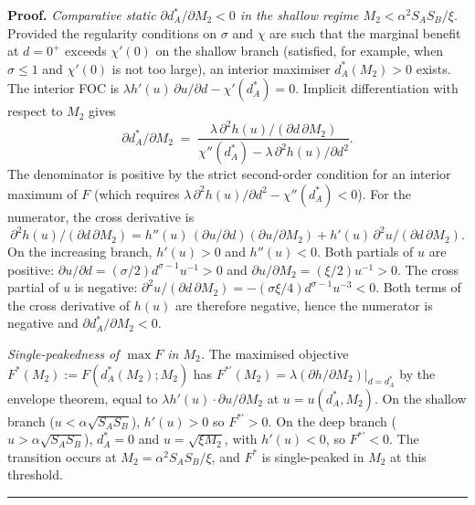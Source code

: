 \documentclass[11pt,twoside]{extarticle}
\newenvironment{proof}[1][Proof]{\noindent \textbf{#1.} }{\ \rule{0.5em}{0.5em}}
\begin{document}
\begin{proof}
\emph{Comparative static $\partial d_A^*/\partial M_2<0$ in the shallow regime $M_2<\alpha^2 S_A S_B/\xi$.} Provided the regularity conditions on $\sigma$ and $\chi$ are such that the marginal benefit at $d=0^+$ exceeds $\chi'(0)$ on the shallow branch (satisfied, for example, when $\sigma\le 1$ and $\chi'(0)$ is not too large), an interior maximiser $d_A^*(M_2)>0$ exists. The interior FOC is $\lambda h'(u)\,\partial u/\partial d-\chi'(d_A^*)=0$. Implicit differentiation with respect to $M_2$ gives
\[
\partial d_A^*/\partial M_2\;=\;\frac{\lambda\,\partial^2 h(u)/(\partial d\,\partial M_2)}{\chi''(d_A^*)-\lambda\,\partial^2 h(u)/\partial d^2}.
\]
The denominator is positive by the strict second-order condition for an interior maximum of $F$ (which requires $\lambda\,\partial^2 h(u)/\partial d^2-\chi''(d_A^*)<0$). For the numerator, the cross derivative is
\[
\partial^2 h(u)/(\partial d\,\partial M_2)=h''(u)\,(\partial u/\partial d)(\partial u/\partial M_2)+h'(u)\,\partial^2 u/(\partial d\,\partial M_2).
\]
On the increasing branch, $h'(u)>0$ and $h''(u)<0$. Both partials of $u$ are positive: $\partial u/\partial d=(\sigma/2)d^{\sigma-1}u^{-1}>0$ and $\partial u/\partial M_2=(\xi/2)u^{-1}>0$. The cross partial of $u$ is negative: $\partial^2 u/(\partial d\,\partial M_2)=-(\sigma\xi/4)d^{\sigma-1}u^{-3}<0$. Both terms of the cross derivative of $h(u)$ are therefore negative, hence the numerator is negative and $\partial d_A^*/\partial M_2<0$.

\emph{Single-peakedness of $\max F$ in $M_2$.} The maximised objective $F^*(M_2):=F(d_A^*(M_2);M_2)$ has $F^{*'}(M_2)=\lambda(\partial h/\partial M_2)|_{d=d_A^*}$ by the envelope theorem, equal to $\lambda h'(u)\cdot\partial u/\partial M_2$ at $u=u(d_A^*,M_2)$. On the shallow branch ($u<\alpha\sqrt{S_A S_B}$), $h'(u)>0$ so $F^{*'}>0$. On the deep branch ($u>\alpha\sqrt{S_A S_B}$), $d_A^*=0$ and $u=\sqrt{\xi M_2}$, with $h'(u)<0$, so $F^{*'}<0$. The transition occurs at $M_2=\alpha^2 S_A S_B/\xi$, and $F^*$ is single-peaked in $M_2$ at this threshold.
\end{proof}
\end{document}
